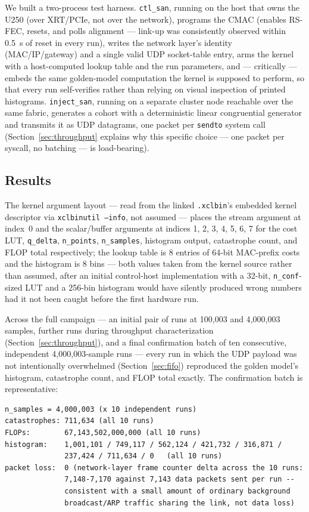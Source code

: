\documentclass[11pt,a4paper]{article}
\newcommand{\code}[1]{\texttt{#1}}
\begin{document}
We built a two-process test harness. \code{ctl\_san}, running on the
host that owns the U250 (over XRT/PCIe, not over the network), programs
the CMAC (enables RS-FEC, resets, and polls alignment --- link-up was
consistently observed within 0.5~s of reset in every run), writes the
network layer's identity (MAC/IP/gateway) and a single valid UDP
socket-table entry, arms the kernel with a host-computed lookup table
and the run parameters, and --- critically --- embeds the same
golden-model computation the kernel is supposed to perform, so that
every run self-verifies rather than relying on visual inspection of
printed histograms. \code{inject\_san}, running on a separate cluster
node reachable over the same fabric, generates a cohort with a
deterministic linear congruential generator and transmits it as UDP
datagrams, one packet per \code{sendto} system call
(Section~\ref{sec:throughput} explains why this specific choice --- one
packet per syscall, no batching --- is load-bearing).

\subsection{Results}

The kernel argument layout --- read from the linked \code{.xclbin}'s
embedded kernel descriptor via \code{xclbinutil --info}, not assumed ---
places the stream argument at index~0 and the scalar/buffer arguments at
indices 1, 2, 3, 4, 5, 6, 7 for the cost LUT, \code{q\_delta},
\code{n\_points}, \code{n\_samples}, histogram output, catastrophe
count, and FLOP total respectively; the lookup table is 8 entries of
64-bit MAC-prefix costs and the histogram is 8 bins --- both values
taken from the kernel source rather than assumed, after an initial
control-host implementation with a 32-bit, \code{n\_conf}-sized LUT and
a 256-bin histogram would have silently produced wrong numbers had it
not been caught before the first hardware run.

Across the full campaign --- an initial pair of runs at 100{,}003 and
4{,}000{,}003 samples, further runs during throughput characterization
(Section~\ref{sec:throughput}), and a final confirmation batch of ten
consecutive, independent 4{,}000{,}003-sample runs --- every run in
which the UDP payload was not intentionally overwhelmed
(Section~\ref{sec:fifo}) reproduced the golden model's histogram,
catastrophe count, and FLOP total exactly. The confirmation batch is
representative:

\begin{center}
\begin{lstlisting}
n_samples = 4,000,003 (x 10 independent runs)
catastrophes: 711,634 (all 10 runs)
FLOPs:        67,143,502,000,000 (all 10 runs)
histogram:    1,001,101 / 749,117 / 562,124 / 421,732 / 316,871 /
              237,424 / 711,634 / 0   (all 10 runs)
packet loss:  0 (network-layer frame counter delta across the 10 runs:
              7,148-7,170 against 7,143 data packets sent per run --
              consistent with a small amount of ordinary background
              broadcast/ARP traffic sharing the link, not data loss)
\end{lstlisting}
\end{center}
\end{document}
